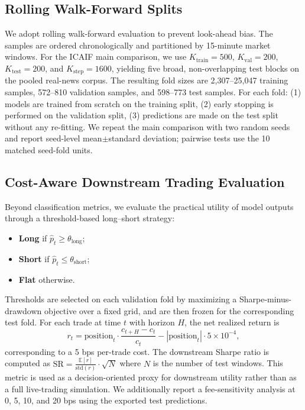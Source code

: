 \subsection{Rolling Walk-Forward Splits}
We adopt rolling walk-forward evaluation to prevent look-ahead bias.
The \dataset{} samples are ordered chronologically and partitioned by 15-minute market windows.
For the ICAIF main comparison, we use $K_{\mathrm{train}}=500$, $K_{\mathrm{val}}=200$, $K_{\mathrm{test}}=200$, and $K_{\mathrm{step}}=1600$, yielding five broad, non-overlapping test blocks on the pooled real-news corpus.
The resulting fold sizes are 2{,}307--25{,}047 training samples, 572--810 validation samples, and 598--773 test samples.
For each fold:
(1) models are trained from scratch on the training split,
(2) early stopping is performed on the validation split,
(3) predictions are made on the test split without any re-fitting.
We repeat the main comparison with two random seeds and report seed-level mean$\pm$standard deviation; pairwise tests use the 10 matched seed-fold units.

\subsection{Cost-Aware Downstream Trading Evaluation}
Beyond classification metrics, we evaluate the practical utility of model outputs through a threshold-based long--short strategy:
\begin{itemize}
  \item \textbf{Long} if $\hat{p}_t \geq \theta_{\mathrm{long}}$;
  \item \textbf{Short} if $\hat{p}_t \leq \theta_{\mathrm{short}}$;
  \item \textbf{Flat} otherwise.
\end{itemize}
Thresholds are selected on each validation fold by maximizing a Sharpe-minus-drawdown objective over a fixed grid, and are then frozen for the corresponding test fold.
For each trade at time $t$ with horizon $H$, the net realized return is
\[
r_t = \mathrm{position}_t \cdot \frac{c_{t+H} - c_t}{c_t} - |\mathrm{position}_t| \cdot 5\times10^{-4},
\]
corresponding to a 5 bps per-trade cost.
The downstream Sharpe ratio is computed as $\mathrm{SR} = \frac{\mathbb{E}[r]}{\mathrm{std}(r)} \cdot \sqrt{N}$ where $N$ is the number of test windows.
This metric is used as a decision-oriented proxy for downstream utility rather than as a full live-trading simulation.
We additionally report a fee-sensitivity analysis at 0, 5, 10, and 20 bps using the exported test predictions.

